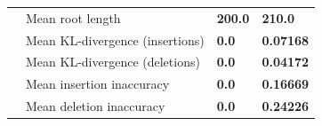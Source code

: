 \documentclass[11pt]{article}
\begin{document}
\begin{table}[]
\begin{tabular}{@{}llll@{}}
\multicolumn{1}{|l|}{} & \multicolumn{1}{l|}{Mean root length}& \multicolumn{1}{l|}{\textbf{200.0}}& \multicolumn{1}{l|}{\textbf{210.0}} \\ \cmidrule(l){2-4}
\multicolumn{1}{|l|}{} & \multicolumn{1}{l|}{Mean KL-divergence (insertions)}& \multicolumn{1}{l|}{\textbf{0.0}}& \multicolumn{1}{l|}{\textbf{0.07168}} \\ \cmidrule(l){2-4}
\multicolumn{1}{|l|}{} & \multicolumn{1}{l|}{Mean KL-divergence (deletions)}& \multicolumn{1}{l|}{\textbf{0.0}}& \multicolumn{1}{l|}{\textbf{0.04172}} \\ \cmidrule(l){2-4}
\multicolumn{1}{|l|}{} & \multicolumn{1}{l|}{Mean insertion inaccuracy}& \multicolumn{1}{l|}{\textbf{0.0}}& \multicolumn{1}{l|}{\textbf{0.16669}} \\ \cmidrule(l){2-4}
\multicolumn{1}{|l|}{} & \multicolumn{1}{l|}{Mean deletion inaccuracy}& \multicolumn{1}{l|}{\textbf{0.0}}& \multicolumn{1}{l|}{\textbf{0.24226}} \\ \midrule

\end{tabular}
\end{table}
\end{document}
